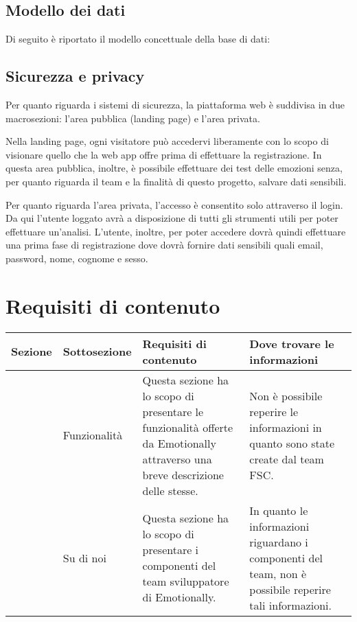 \subsection{Modello dei dati}
Di seguito è riportato il modello concettuale della base di dati:


\subsection{Sicurezza e privacy}
Per quanto riguarda i sistemi di sicurezza, la piattaforma web è suddivisa in 
due macrosezioni: l'area pubblica (landing page) e l'area privata.

Nella landing page, ogni visitatore può accedervi liberamente con lo scopo di 
visionare quello che la web app offre prima di effettuare la registrazione. In 
questa area pubblica, inoltre, è possibile effettuare dei test delle emozioni 
senza, per quanto riguarda il team e la finalità di questo progetto, salvare 
dati sensibili.

Per quanto riguarda l'area privata, l'accesso è consentito solo attraverso il 
login. Da qui l'utente loggato avrà a disposizione di tutti gli strumenti utili 
per poter effettuare un'analisi. L'utente, inoltre, per poter accedere dovrà 
quindi effettuare una prima fase di registrazione dove dovrà fornire dati 
sensibili quali email, password, nome, cognome e sesso.

\section{Requisiti di contenuto}\label{sec:requisiti-di-contenuto}
\begin{table}[H]
	\centering
	\caption{Contenuti di Emotionally.}
	\label{tab:bisogni-utenti}
	\begin{longtable}{@{}|>{\centering\arraybackslash}m{}|m{}|m{}|>{\centering\arraybackslash}m{}|@{}}
		\hline
		\rowcolor{emotionally-color!35}
		{\textbf{Sezione}}   & {\textbf{Sottosezione}}     & {\textbf{Requisiti di 
		contenuto}} & {\textbf{Dove trovare le informazioni}} 
		\\\hline
		\endfirsthead
		\cellcolor{white!0}  & Funzionalità & Questa sezione ha lo scopo di 
		presentare 
		le funzionalità offerte da Emotionally attraverso una breve descrizione 
		delle stesse. & Non è possibile reperire le informazioni in quanto sono 
		state create dal team FSC.\\
		\multirow{-2}{*}{Landing page} & Su di noi & Questa sezione ha lo scopo 
		di 
		presentare i componenti del team sviluppatore di Emotionally. & In 
		quanto le informazioni riguardano i componenti del team, non è 
		possibile reperire tali informazioni. \\		
		\hline
	\end{longtable}
\end{table}

